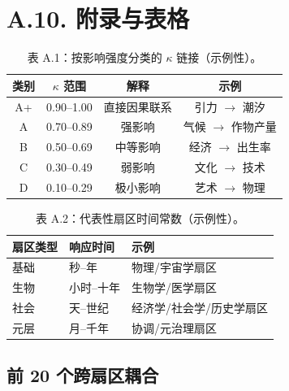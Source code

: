 \documentclass[11pt,a4paper]{article}
\begin{document}
	\section*{A.10. 附录与表格}
	
	\begin{table}[htbp]
		\centering
		\small
		\begin{tabular}{cccc}
			\toprule
			\textbf{类别} & \textbf{$\kappa$ 范围} & \textbf{解释} & \textbf{示例} \\
			\midrule
			A+ & 0.90--1.00 & 直接因果联系 & 引力 $\rightarrow$ 潮汐 \\
			A  & 0.70--0.89 & 强影响 & 气候 $\rightarrow$ 作物产量 \\
			B  & 0.50--0.69 & 中等影响 & 经济 $\rightarrow$ 出生率 \\
			C  & 0.30--0.49 & 弱影响 & 文化 $\rightarrow$ 技术 \\
			D  & 0.10--0.29 & 极小影响 & 艺术 $\rightarrow$ 物理 \\
			\bottomrule
		\end{tabular}
		\caption{表 A.1：按影响强度分类的 $\kappa$ 链接（示例性）。}
	\end{table}
	
	\begin{table}[htbp]
		\centering
		\small
		\begin{tabular}{p{}p{}p{}}
			\toprule
			\textbf{扇区类型} & \textbf{响应时间} & \textbf{示例} \\
			\midrule
			基础 & 秒–年 & 物理/宇宙学扇区 \\
			生物 & 小时–十年 & 生物学/医学扇区 \\
			社会 & 天–世纪 & 经济学/社会学/历史学扇区 \\
			元层 & 月–千年 & 协调/元治理扇区 \\
			\bottomrule
		\end{tabular}
		\caption{表 A.2：代表性扇区时间常数（示例性）。}
	\end{table}
	
	\subsection*{前 20 个跨扇区耦合}
	
\end{document}
